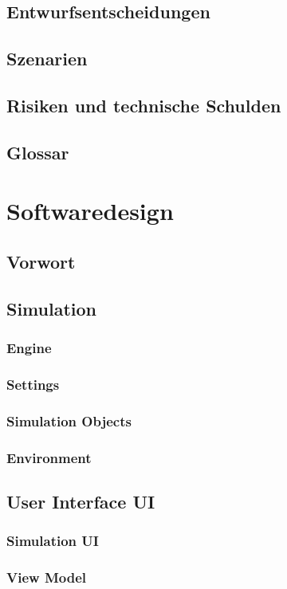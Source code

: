 \documentclass[12pt,a4paper,bibliography=totocnumbered,listof=totocnumbered]{scrartcl}
\begin{document}
\subsection{Entwurfsentscheidungen}
\subsection{Szenarien}
\subsection{Risiken und technische Schulden}
\subsection{Glossar}
\newpage
\section{Softwaredesign}
\sloppy
\subsection{Vorwort}
\subsection{Simulation}
\subsubsection{Engine}
\subsubsection{Settings}
\subsubsection{Simulation Objects}
\subsubsection{Environment}
\subsection{User Interface UI}
\subsubsection{Simulation UI}
\subsubsection{View Model}
\end{document}
